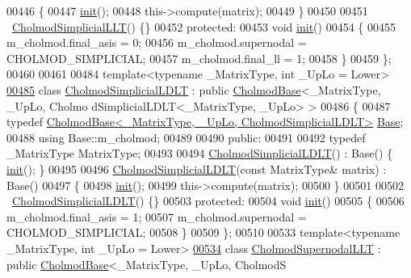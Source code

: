 \begin{DoxyCode}
00446     \{
00447       \hyperlink{structinit}{init}();
00448       this->compute(matrix);
00449     \}
00450 
00451     ~\hyperlink{class_eigen_1_1_cholmod_simplicial_l_l_t}{CholmodSimplicialLLT}() \{\}
00452   \textcolor{keyword}{protected}:
00453     \textcolor{keywordtype}{void} \hyperlink{structinit}{init}()
00454     \{
00455       m\_cholmod.final\_asis = 0;
00456       m\_cholmod.supernodal = CHOLMOD\_SIMPLICIAL;
00457       m\_cholmod.final\_ll = 1;
00458     \}
00459 \};
00460 
00461 
00484 \textcolor{keyword}{template}<\textcolor{keyword}{typename} \_MatrixType, \textcolor{keywordtype}{int} \_UpLo = Lower>
\hyperlink{class_eigen_1_1_cholmod_simplicial_l_d_l_t}{00485} \textcolor{keyword}{class }\hyperlink{class_eigen_1_1_cholmod_simplicial_l_d_l_t}{CholmodSimplicialLDLT} : \textcolor{keyword}{public} \hyperlink{class_eigen_1_1_cholmod_base}{CholmodBase}<\_MatrixType, \_UpLo, Cholmo
      dSimplicialLDLT<\_MatrixType, \_UpLo> >
00486 \{
00487     \textcolor{keyword}{typedef} \hyperlink{class_eigen_1_1_cholmod_base}{CholmodBase<\_MatrixType, \_UpLo, CholmodSimplicialLDLT>}
       \hyperlink{class_eigen_1_1_cholmod_base}{Base};
00488     \textcolor{keyword}{using} Base::m\_cholmod;
00489     
00490   \textcolor{keyword}{public}:
00491     
00492     \textcolor{keyword}{typedef} \_MatrixType MatrixType;
00493     
00494     \hyperlink{class_eigen_1_1_cholmod_simplicial_l_d_l_t}{CholmodSimplicialLDLT}() : Base() \{ \hyperlink{structinit}{init}(); \}
00495 
00496     \hyperlink{class_eigen_1_1_cholmod_simplicial_l_d_l_t}{CholmodSimplicialLDLT}(\textcolor{keyword}{const} MatrixType& matrix) : Base()
00497     \{
00498       \hyperlink{structinit}{init}();
00499       this->compute(matrix);
00500     \}
00501 
00502     ~\hyperlink{class_eigen_1_1_cholmod_simplicial_l_d_l_t}{CholmodSimplicialLDLT}() \{\}
00503   \textcolor{keyword}{protected}:
00504     \textcolor{keywordtype}{void} \hyperlink{structinit}{init}()
00505     \{
00506       m\_cholmod.final\_asis = 1;
00507       m\_cholmod.supernodal = CHOLMOD\_SIMPLICIAL;
00508     \}
00509 \};
00510 
00533 \textcolor{keyword}{template}<\textcolor{keyword}{typename} \_MatrixType, \textcolor{keywordtype}{int} \_UpLo = Lower>
\hyperlink{class_eigen_1_1_cholmod_supernodal_l_l_t}{00534} \textcolor{keyword}{class }\hyperlink{class_eigen_1_1_cholmod_supernodal_l_l_t}{CholmodSupernodalLLT} : \textcolor{keyword}{public} \hyperlink{class_eigen_1_1_cholmod_base}{CholmodBase}<\_MatrixType, \_UpLo, CholmodS

\end{DoxyCode}
